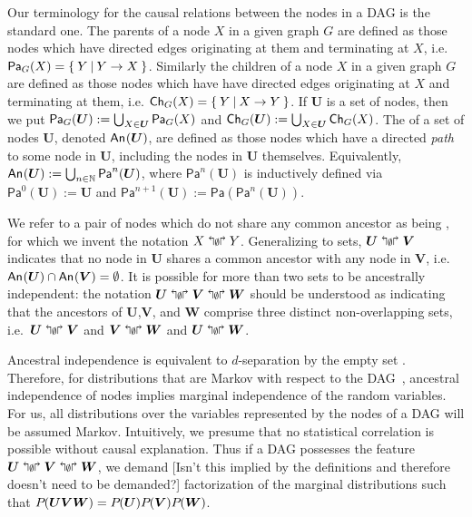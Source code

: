 {%


 \color{black}

Our terminology for the causal relations between the nodes in a DAG is the standard one. The parents of a node $X$ in a given graph $G$ are defined as those nodes which have directed edges originating at them and terminating at $X$, i.e. $\Pa[G]{X} = \{\:Y\:|\:Y\to X\:\}$.  Similarly the children of a node $X$ in a given graph $G$ are defined as those nodes which have have directed edges originating at $X$ and terminating at them, i.e. $\Ch[G]{X} = \{\:Y\:|\: X\to Y\:\}$. If $\bm{U}$ is a set of nodes, then we put $\Pa[G]{\bm{U}} := \bigcup_{X\in\bm{U}} \Pa[G]{X}$ and $\Ch[G]{\bm{U}} := \bigcup_{X\in\bm{U}} \Ch[G]{X}$.  The  of a set of nodes $\bm{U}$, denoted $\An{\bm{U}}$, are defined as those nodes which have a directed \emph{path} to some node in $\bm{U}$, including the nodes in $\bm{U}$ themselves. Equivalently, $\An{\bm{U}} := \bigcup_{n\in\mathbb{N}} \mathsf{Pa}^n(\bm{U})$, where $\mathsf{Pa}^n(\bm{U})$ is inductively defined via $\mathsf{Pa}^0(\bm{U}) := \bm{U}$ and $\mathsf{Pa}^{n+1}(\bm{U}) := \mathsf{Pa}(\mathsf{Pa}^n(\bm{U}))$. 

We refer to a pair of nodes which do not share any common ancestor as being , for which we invent the notation $X\aindep Y$. Generalizing to sets, $\bm{U}\aindep \bm{V}$ indicates that no node in $\bm{U}$ shares a common ancestor with any node in $\bm{V}$, i.e.~$\An{\bm{U}}\cap\An{\bm{V}}=\emptyset$. It is possible for more than two sets to be ancestrally independent: the notation ${\bm{U}\aindep \bm{V}\aindep \bm{W}}$ should be understood as indicating that the ancestors of $\bm{U}$,$\bm{V}$, and $\bm{W}$ comprise three distinct non-overlapping sets, i.e.~$\bm{U}\aindep \bm{V}$ and $\bm{V}\aindep \bm{W}$ and $\bm{U}\aindep \bm{W}$.

Ancestral independence is equivalent to $d$-separation by the empty set \cite{pearl2009causality,spirtes2011causation,studeny2005probabilistic,koller2009probabilistic}. Therefore, for distributions that are Markov with respect to the DAG~\cite{pearl2009causality,spirtes2011causation,studeny2005probabilistic,koller2009probabilistic}, ancestral independence of nodes implies marginal independence of the random variables. For us, all distributions over the variables represented by the nodes of a DAG will be assumed Markov. Intuitively, we presume that no statistical correlation is possible without causal explanation. Thus if a DAG possesses the feature ${\bm{U}\aindep \bm{V}\aindep \bm{W}}$, we demand \color{red} [Isn't this implied by the definitions and therefore doesn't need to be demanded?] \color{black} factorization of the marginal distributions such that ${\pdf{\bm{U} \bm{V} \bm{W}} = \pdf{\bm{U}} \pdf{\bm{V}} \pdf{\bm{W}}}$.


}
